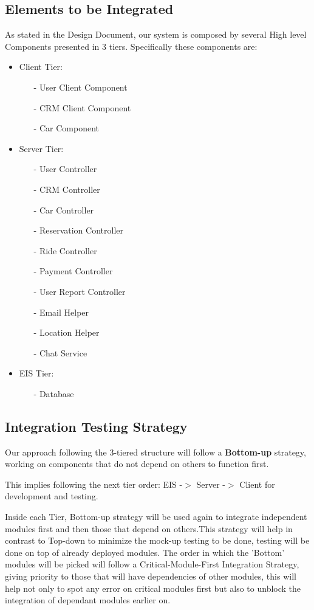 \documentclass[a4paper]{article}
\begin{document}
\subsection{Elements to be Integrated}
As stated in the Design Document, our system is composed by several High level Components presented in 3 tiers. Specifically these components are:
\begin{itemize}
\item Client Tier:
\begin{itemize}
\item[-] User Client Component
\item[-] CRM Client Component
\item[-] Car Component
\end{itemize}
\item Server Tier:
\begin{itemize}
\item[-] User Controller
\item[-] CRM Controller
\item[-] Car Controller
\item[-] Reservation Controller
\item[-] Ride Controller
\item[-] Payment Controller
\item[-] User Report Controller
\item[-] Email Helper
\item[-] Location Helper
\item[-] Chat Service
\end{itemize}
\item EIS Tier:
\begin{itemize}
\item[-] Database
\end{itemize}
\end{itemize}

\subsection{Integration Testing Strategy}
Our approach following the 3-tiered structure will follow a \textbf{Bottom-up} strategy, working on components that do not depend on others to function first. \par
This implies following the next tier order: EIS -\(>\) Server -\(>\) Client for development and testing.\par
Inside each Tier, Bottom-up strategy will be used again to integrate independent modules first and then those that depend on others.This strategy will help in contrast to Top-down to minimize the mock-up testing to be done, testing will be done on top of already deployed modules. The order in which the 'Bottom' modules will be picked will follow a Critical-Module-First Integration Strategy, giving priority to those that will have dependencies of other modules, this will help not only to spot any error on critical modules first but also to unblock the integration of dependant modules earlier on.
\end{document}
